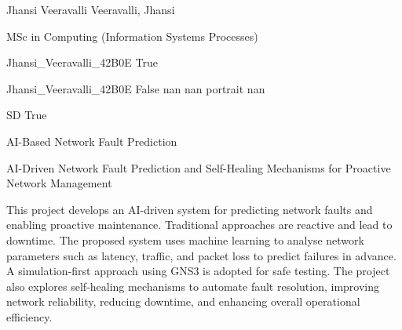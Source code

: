 \documentclass[twoside]{report}
\begin{document}
\begingroup{}\relax



\def\Key{Jhansi_Veeravalli_42B0E}

{Jhansi Veeravalli}
{Veeravalli, Jhansi}

{MSc in Computing (Information Systems Processes)}

{Jhansi_Veeravalli_42B0E}
{True}

{Jhansi_Veeravalli_42B0E}
{False}
{nan}
{nan}
{portrait}
{nan}

{SD}
{True}

{AI-Based Network Fault Prediction}

{AI-Driven Network Fault Prediction and Self-Healing Mechanisms for Proactive Network Management}

{This project develops an AI-driven system for predicting network faults and enabling proactive maintenance. Traditional approaches are reactive and lead to downtime. The proposed system uses machine learning to analyse network parameters such as latency, traffic, and packet loss to predict failures in advance. A simulation-first approach using GNS3 is adopted for safe testing. The project also explores self-healing mechanisms to automate fault resolution, improving network reliability, reducing downtime, and enhancing overall operational efficiency.}
\end{document}
